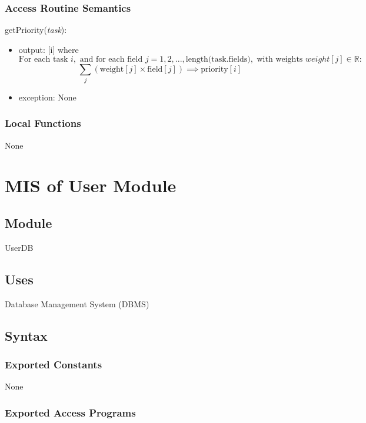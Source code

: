 \documentclass[12pt, titlepage]{article}
\begin{document}
\subsubsection{Access Routine Semantics}


\noindent getPriority(\textit{task}):
\begin{itemize}
\item output: [i] where \[ 
\text{For each task } i, \text{ and for each field } j = 1, 2, ..., \text{length(task.fields)}, \text{ with weights } weight[j] \in \mathbb{R}: 
\]
\[
\sum_{j}{} (\text{weight}[j] \times \text{field}[j]) \implies \text{priority}[i]
\]

\item exception: None
\end{itemize}

\subsubsection{Local Functions}
None

\newpage
\section{MIS of User Module} \label{UserModule}

\subsection{Module}

UserDB

\subsection{Uses}

Database Management System (DBMS)

\subsection{Syntax}

\subsubsection{Exported Constants}

None

\subsubsection{Exported Access Programs}
\end{document}
